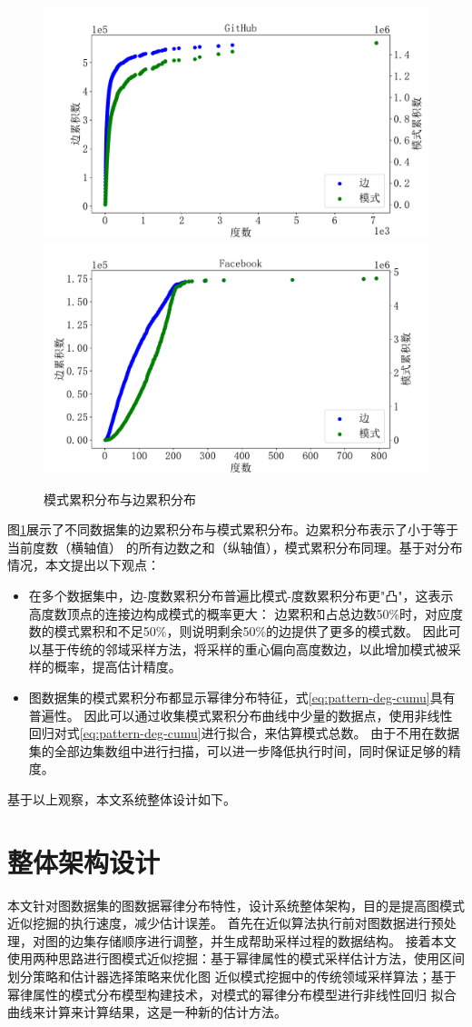 \documentclass[master]{thesis-uestc}
\begin{document}
\begin{figure}
    \includegraphics[width=0.5\linewidth]{pic/powerlaw/GitHub.pdf}%
    \includegraphics[width=0.5\linewidth]{pic/powerlaw/Facebook.pdf}
    \caption{模式累积分布与边累积分布}
    \label{fig:pattern-edge-dis}
\end{figure}

    图\ref{fig:pattern-edge-dis}展示了不同数据集的边累积分布与模式累积分布。边累积分布表示了小于等于当前度数（横轴值）
的所有边数之和（纵轴值），模式累积分布同理。基于对分布情况，本文提出以下观点：
\begin{itemize}
    
    \item 在多个数据集中，边-度数累积分布普遍比模式-度数累积分布更"凸"，这表示高度数顶点的连接边构成模式的概率更大：
    边累积和占总边数50\%时，对应度数的模式累积和不足50\%，则说明剩余50\%的边提供了更多的模式数。
    因此可以基于传统的邻域采样方法，将采样的重心偏向高度数边，以此增加模式被采样的概率，提高估计精度。
    
    \item 图数据集的模式累积分布都显示幂律分布特征，式\ref{eq:pattern-deg-cumu}具有普遍性。
    因此可以通过收集模式累积分布曲线中少量的数据点，使用非线性回归对式\ref{eq:pattern-deg-cumu}进行拟合，来估算模式总数。
    由于不用在数据集的全部边集数组中进行扫描，可以进一步降低执行时间，同时保证足够的精度。
\end{itemize}

    基于以上观察，本文系统整体设计如下。

\section{整体架构设计}
\label{sec:overall-architecture}
    本文针对图数据集的图数据幂律分布特性，设计系统整体架构，目的是提高图模式近似挖掘的执行速度，减少估计误差。
首先在近似算法执行前对图数据进行预处理，对图的边集存储顺序进行调整，并生成帮助采样过程的数据结构。
接着本文使用两种思路进行图模式近似挖掘：基于幂律属性的模式采样估计方法，使用区间划分策略和估计器选择策略来优化图
近似模式挖掘中的传统领域采样算法；基于幂律属性的模式分布模型构建技术，对模式的幂律分布模型进行非线性回归
拟合曲线来计算来计算结果，这是一种新的估计方法。
 
\end{document}
